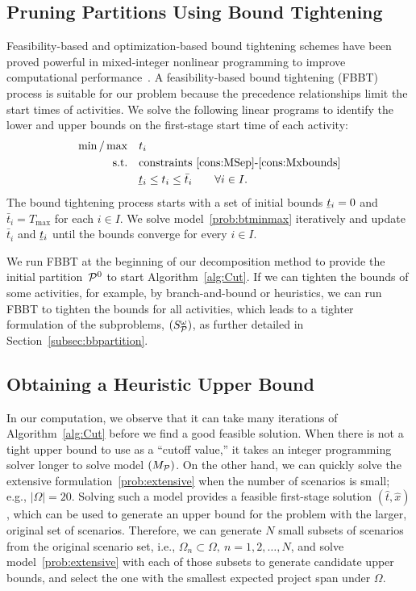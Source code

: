 \documentclass[11pt]{article}
\newcommand{\cP}{{\cal P}}
\renewcommand{\underbar}{\underaccent{\bar}}
\begin{document}
	\subsection{Pruning Partitions Using Bound Tightening} \label{subsec:FBBT}
	Feasibility-based and optimization-based bound tightening schemes have been proved powerful in mixed-integer nonlinear programming to improve computational performance~\citep[e.g.,][]{belotti2012fbbt,coffrin2015strengthening,sundar2018OBBT}. A feasibility-based bound tightening (FBBT) process is suitable for our problem because the precedence relationships limit the start times of  activities. We solve the following linear programs to identify the lower and upper bounds on the first-stage start time of each activity: 
	\begin{subequations} \label{prob:btminmax}
		\begin{align}
		\min/\max \quad & t_i \\
		\text{s.t.} \quad & \text{constraints \eqref{cons:MSep}-\eqref{cons:Mxbounds}}\\
		& \underbar{t}_i \leq t_i \leq \bar{t}_i \qquad \forall i \in I.
		\end{align}
	\end{subequations}
	The bound tightening process starts with a set of initial bounds \(\underbar{t}_i = 0\) and \(\bar{t}_i = T_{\max}\) for each \(i \in I\). We solve model~\eqref{prob:btminmax} iteratively and update \(\bar{t}_i\) and \(\underbar{t}_i\) until the bounds converge for every \(i \in I\).
	
	We run FBBT at the beginning of our decomposition method to provide the initial partition~\(\cP^0\) to start Algorithm~\ref{alg:Cut}. If we can tighten the bounds of some activities, for example, by branch-and-bound or heuristics, we can run FBBT to tighten the bounds for all activities, which leads to a tighter formulation of the subproblems, \((S^{\omega}_{\cP})\), as further detailed in Section~\ref{subsec:bbpartition}.
	
	\subsection{Obtaining a Heuristic Upper Bound} \label{subsec:HUB}
	In our computation, we observe that it can take many iterations of Algorithm~\ref{alg:Cut} before we find a good feasible solution. When there is not a tight upper bound to use as a ``cutoff value,'' it takes an integer programming solver longer to solve model \((M_{\cP})\). On the other hand, we can quickly solve the extensive formulation~\eqref{prob:extensive} when the number of scenarios is small; e.g., \(|\Omega| = 20\). Solving such a model provides a feasible first-stage solution \((\hat{t},\hat{x})\), which can be used to generate an upper bound for the problem with the larger, original set of scenarios. Therefore, we can generate \(N\) small subsets of scenarios from the original scenario set, i.e., \(\Omega_n \subset \Omega,\ n = 1,2,\dots,N\), and solve model~\eqref{prob:extensive} with each of those subsets to generate candidate upper bounds, and select the one with the smallest expected project span under $\Omega$. 
	
\end{document}

